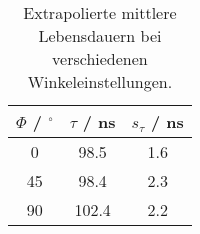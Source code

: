 \begin{table}[H]
\caption{Extrapolierte mittlere Lebensdauern bei verschiedenen Winkeleinstellungen.}
\begin{center}
\begin{tabular}{|c|c|c|}
  \hline
  $\Phi$ / ${}^{\circ}$ & $\tau$ / ns & $s_{\tau}$ / ns \\ \hline
  0 & 98.5 & 1.6 \\ \hline
  45 & 98.4 & 2.3 \\ \hline
  90 & 102.4 & 2.2 \\ \hline
\end{tabular}
\end{center}
\label{tab:tau:final}
\end{table}
